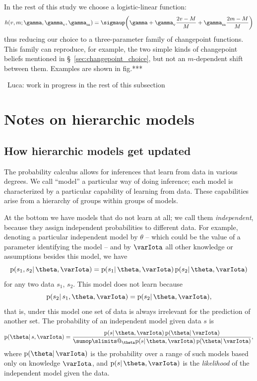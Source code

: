 \documentclass[\ifafour a4paper,12pt,\else a5paper,10pt,\fi%
onecolumn,oneside,article,%
british%
]{memoir}
\makeatletter
\theoremstyle{remark}
\theoremstyle{innote}
\def\sum{\DOTSI\sumop\slimits@}
\newcommand*{\pf}{\mathrm{p}}%
\renewcommand*{\|}{\mathpunct{|}}
\newcommand*{\sect}{\S}%
\newcommand*{\fig}{fig.}%
\newcommand*{\puzzle}{\maltese}
\newcommand{\mynote}[1]{ {\color{notecolour}\puzzle\ #1\ }}
\newcommand*{\yI}{\varIota}
\newcommand*{\yth}{\theta}
\newcommand*{\yrs}{h}
\newcommand*{\yc}{\gamma}
\newcommand*{\ycs}{\gamma_{\textrm{v}}}
\newcommand*{\ycm}{\gamma_{\textrm{m}}}
\newcommand*{\logistic}{\sigmaup}
\makeatother
\begin{document}
In the rest of this study we choose a logistic-linear function:
\begin{equation}
  \label{eq:logistic_linear}
  \yrs(v,m; \yc,\ycs,\ycm) = \logistic\biggl( \yc +
  \ycs \frac{2 v-M}{M} + \ycm \frac{2 m-M}{M}\biggr) 
\end{equation}
thus reducing our choice to a three-parameter family of changepoint
functions. This family can reproduce, for example, the two simple kinds of
changepoint beliefs mentioned in \sect~\ref{sec:changepoint_choice}, but
not an $m$-dependent shift between them. Examples are shown in \fig***




\bigskip\mynote{Luca: work in progress in the rest of this subsection}


\clearpage

\section{Notes on hierarchic models}
\label{sec:notes_hierarchic}

\subsection{How hierarchic models get updated}
\label{sec:hierarchic_models}

The probability calculus allows for inferences that learn from data in
various degrees. We call \enquote{model} a particular way of doing
inference; each model is characterized by a particular capability of
learning from data. These capabilities arise from a hierarchy of groups
within groups of models.

At the bottom we have models that do not learn at all; we call them
\emph{independent}, because they assign independent probabilities to
different data. For example, denoting a particular independent model by
$\yth$ -- which could be the value of a parameter identifying the model --
and by $\yI$ all other knowledge or assumptions besides this model, we have
\begin{equation}
  \label{eq:indep_model}
  \pf(s_1,s_2 \| \yth, \yI) = \pf(s_1 \|\yth,\yI) \, \pf(s_2 \|\yth,\yI)
\end{equation}
for any two data $s_1$, $s_2$. This model does not learn because
\begin{equation}
  \label{eq:indep_model_nolearn}
  \pf(s_2\| s_1, \yth, \yI) = \pf(s_2 \|\yth,\yI),
\end{equation}
that is, under this model one set of data is always irrelevant for the
prediction of another set. The probability of an independent model given
data $s$ is
\begin{equation}
  \label{eq:prob_indep_model}
  \pf(\yth \| s, \yI)
  = \frac{
    \pf(s \|\yth,\yI) \, \pf(\yth \| \yI)
  }{
    \sum_{\yth}\pf(s \|\yth,\yI) \, \pf(\yth \| \yI)
  },
\end{equation}
where $\pf(\yth \|\yI)$ is the probability over a range of such models
based only on knowledge $\yI$, and $\pf(s \|\yth,\yI)$ is the
\emph{likelihood} of the independent model given the data.
\end{document}
